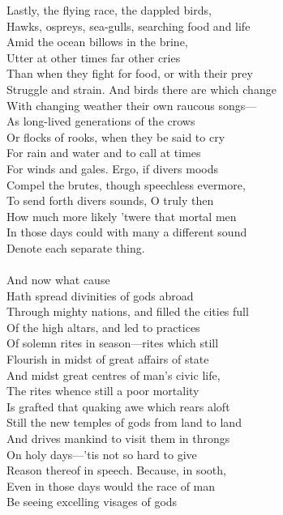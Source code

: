Lastly, the flying race, the dappled birds,\\
Hawks, ospreys, sea-gulls, searching food and life\\
Amid the ocean billows in the brine,\\
Utter at other times far other cries\\
Than when they fight for food, or with their prey\\
Struggle and strain. And birds there are which change\\
With changing weather their own raucous songs—\\
As long-lived generations of the crows\\
Or flocks of rooks, when they be said to cry\\
For rain and water and to call at times\\
For winds and gales. Ergo, if divers moods\\
Compel the brutes, though speechless evermore,\\
To send forth divers sounds, O truly then\\
How much more likely 'twere that mortal men\\
In those days could with many a different sound\\
Denote each separate thing.\\
\\
And now what cause\\
Hath spread divinities of gods abroad\\
Through mighty nations, and filled the cities full\\
Of the high altars, and led to practices\\
Of solemn rites in season—rites which still\\
Flourish in midst of great affairs of state\\
And midst great centres of man's civic life,\\
The rites whence still a poor mortality\\
Is grafted that quaking awe which rears aloft\\
Still the new temples of gods from land to land\\
And drives mankind to visit them in throngs\\
On holy days—'tis not so hard to give\\
Reason thereof in speech. Because, in sooth,\\
Even in those days would the race of man\\
Be seeing excelling visages of gods\\
